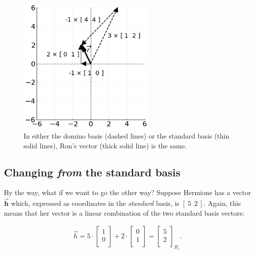 \begin{figure}[ht]
\centering
\includegraphics[width=0.6\textwidth]{basis.png}
\caption{In either the domino basis (dashed lines) or the standard basis (thin
solid lines), Ron's vector (thick solid line) is the same.}
\label{fig:basis}
\end{figure}


\subsection{Changing \textit{from} the standard basis}


By the way, what if we want to go the other way? Suppose Hermione has a vector
$\overrightarrow{\textbf{h}}$ which, expressed as coordinates in the
\textit{standard} basis, is $[\ 5\ \ 2\ ]$. Again, this means that her vector
is a linear combination of the two standard basis vectors:

\vspace{-.15in}
\begin{align*}
\overrightarrow{h} = 5 \cdot \begin{bmatrix} 1 \\ 0 \\ \end{bmatrix} +
2 \cdot \begin{bmatrix} 0 \\ 1 \\ \end{bmatrix} = 
\begin{bmatrix} 5 \\ 2 \\ \end{bmatrix}_{B_s}.
\end{align*}
\vspace{-.15in}


